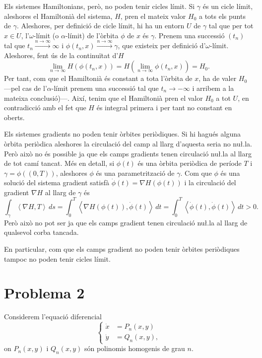 \documentclass[12pt]{article}
\newcommand{\inn}[2]{\left\langle #1 , #2 \right\rangle}
\begin{document}
\begin{enumerate}[label=(\roman*), font=\bfseries \sffamily, wide, labelwidth=!, labelindent=0pt]
		Els sistemes Hamiltonians, però, no poden tenir cicles límit. Si \( \gamma \) és un cicle límit, aleshores el Hamiltonià del sistema, \( H \), pren el mateix valor \( H_0 \) a tots els punts de \( \gamma \). Aleshores, per definició de cicle límit, hi ha un entorn \( U \) de \( \gamma \) tal que per tot \( x \in U \), l'\( \omega \)-límit (o \( \alpha \)-límit) de l'òrbita \( \phi \) de \( x \) és \( \gamma \). Prenem una successió \( (t_n) \) tal que \( t_n \xrightarrow{n \to \infty} \infty \) i \( \phi(t_n, x) \xrightarrow{n \to \infty} \gamma \), que existeix per definició d'\( \omega \)-límit. Aleshores, fent ús de la continuïtat d'\( H \)
		\begin{equation*}
			\lim_{n \to \infty}{H(\phi(t_n, x))} = H\left(\lim_{n \to \infty}{\phi(t_n, x)}\right) = H_0.
		\end{equation*}
		Per tant, com que el Hamiltonià és constant a tota l'òrbita de \( x \), ha de valer \( H_0 \) ---pel cas de l'\( \alpha \)-límit prenem una successió tal que \( t_n \to -\infty \) i arribem a la mateixa conclusió)---. Així, tenim que el Hamiltonià pren el valor \( H_0 \) a tot \( U \), en contradicció amb el fet que \( H \) és integral primera i per tant no constant en oberts. 

		Els sistemes gradients no poden tenir òrbites periòdiques. Si hi hagués alguna òrbita periòdica aleshores la circulació del camp al llarg d'aquesta seria no nu\l.la. Però això no és possible ja que els camps gradients tenen circulació nu\l.la al llarg de tot camí tancat. Més en detall, si \( \phi(t) \) és una òrbita periòdica de període \( T \) i \( \gamma = \phi((0, T)) \), aleshores \( \phi \) és una parametrització de \( \gamma \). Com que \( \phi \) és una solució del sistema gradient satisfà \( \dot{\phi}(t) = \nabla H(\phi(t)) \) i la circulació del gradient \( \nabla H \) al llarg de \( \gamma \) és
		\begin{equation*}
			\int_{\gamma} \inn{\nabla H}{T} \, ds = \int_{0}^{T} \inn{\nabla H(\phi(t))}{\dot{\phi}(t)} \, dt = \int_0^T \inn{\dot{\phi}(t)}{\dot{\phi}(t)} \, dt > 0.
		\end{equation*}
		Però això no pot ser ja que els camps gradient tenen circulació nu\l.la al llarg de qualsevol corba tancada.

		En particular, com que els camps gradient no poden tenir òrbites periòdiques tampoc no poden tenir cicles límit.
\end{enumerate}

\section*{Problema 2}
Considerem l'equació diferencial 
\begin{equation*}
	\left\{ 
		\begin{aligned}
			\dot{x} & = P_n(x,y) \\
			\dot{y} & = Q_n(x,y),
		\end{aligned} 
	\right. 
\end{equation*}
on \( P_n(x,y) \) i \( Q_n(x,y) \) són polinomis homogenis de grau \( n \). 
\end{document}
